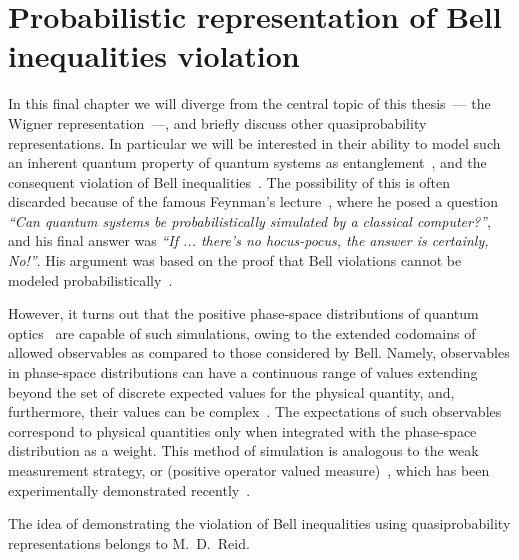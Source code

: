 \chapter{Probabilistic representation of Bell inequalities violation}
\label{cha:bell-ineq}

In this final chapter we will diverge from the central topic of this thesis~--- the Wigner representation~---, and briefly discuss other quasiprobability representations.
In particular we will be interested in their ability to model such an inherent quantum property of quantum systems as entanglement~\cite{Einstein1935}, and the consequent violation of Bell inequalities~\cite{Bell1964}.
The possibility of this is often discarded because of the famous Feynman's lecture~\cite{Feynman1982}, where he posed a question \textit{``Can quantum systems be probabilistically simulated by a classical computer?''}, and his final answer was \textit{``If ... there's no hocus-pocus, the answer is certainly, No!''}.
His argument was based on the proof that Bell violations cannot be modeled probabilistically~\cite{Bell1964}.

However, it turns out that the positive phase-space distributions of quantum optics~\cite{Husimi1940,Drummond1980,Hillery1984,Gardiner2004} are capable of such simulations, owing to the extended codomains of allowed observables as compared to those considered by Bell.
Namely, observables in phase-space distributions can have a continuous range of values extending beyond the set of discrete expected values for the physical quantity, and, furthermore, their values can be complex~\cite{Reid1986}.
The expectations of such observables correspond to physical quantities only when integrated with the phase-space distribution as a weight.
This method of simulation is analogous to the weak measurement strategy, or  (positive operator valued measure)~\cite{Aharonov1988}, which has been experimentally demonstrated recently~\cite{Goggin2011}.

The idea of demonstrating the violation of Bell inequalities using quasiprobability representations belongs to M.~D.~Reid.





